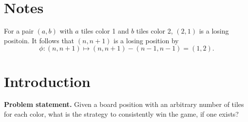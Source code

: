 \documentclass[11pt, letterpaper]{article}
\begin{document}
\section{Notes}
For a pair $(a,b)$ with $a$ tiles color 1 and $b$ tiles color 2, $(2,1)$ is a losing positoin. It follows that $(n,n+1)$ is a losing position by
\[
	\phi : \left( n,n+1 \right)  \mapsto \left( n,n+1 \right) -\left( n-1,n-1 \right) =\left( 1,2 \right) 
.\]
\section{Introduction}\label{sec:1}
\begin{mdframed}[linewidth=1pt]
	\textbf{Problem statement.} Given a board position with an arbitrary number of tiles for each color, what is the strategy to consistently win the game, if one exists?
\end{mdframed}
\end{document}
